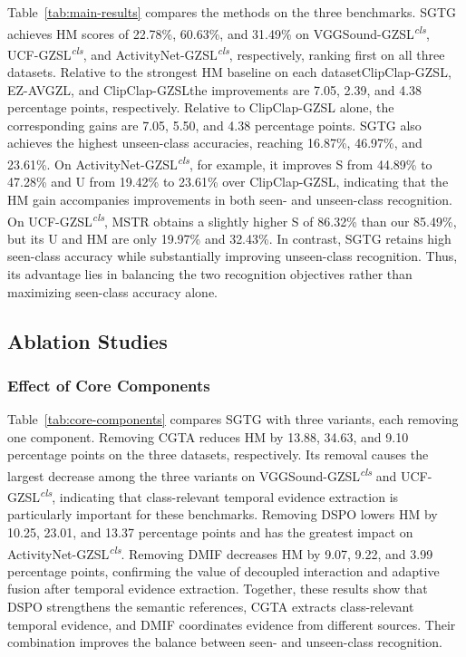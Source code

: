 Table~\ref{tab:main-results} compares the methods on the three benchmarks. SGTG achieves HM scores of 22.78\%, 60.63\%, and 31.49\% on VGGSound-GZSL\textsuperscript{\textit{cls}}, UCF-GZSL\textsuperscript{\textit{cls}}, and ActivityNet-GZSL\textsuperscript{\textit{cls}}, respectively, ranking first on all three datasets. Relative to the strongest HM baseline on each dataset\textemdash{}ClipClap-GZSL, EZ-AVGZL, and ClipClap-GZSL\textemdash{}the improvements are 7.05, 2.39, and 4.38 percentage points, respectively. Relative to ClipClap-GZSL alone, the corresponding gains are 7.05, 5.50, and 4.38 percentage points. SGTG also achieves the highest unseen-class accuracies, reaching 16.87\%, 46.97\%, and 23.61\%. On ActivityNet-GZSL\textsuperscript{\textit{cls}}, for example, it improves S from 44.89\% to 47.28\% and U from 19.42\% to 23.61\% over ClipClap-GZSL, indicating that the HM gain accompanies improvements in both seen- and unseen-class recognition. On UCF-GZSL\textsuperscript{\textit{cls}}, MSTR obtains a slightly higher S of 86.32\% than our 85.49\%, but its U and HM are only 19.97\% and 32.43\%. In contrast, SGTG retains high seen-class accuracy while substantially improving unseen-class recognition. Thus, its advantage lies in balancing the two recognition objectives rather than maximizing seen-class accuracy alone.

\subsection{Ablation Studies}\label{sec:ablation-studies}

\subsubsection{Effect of Core Components}\label{sec:effect-of-core-components}


Table~\ref{tab:core-components} compares SGTG with three variants, each removing one component. Removing CGTA reduces HM by 13.88, 34.63, and 9.10 percentage points on the three datasets, respectively. Its removal causes the largest decrease among the three variants on VGGSound-GZSL\textsuperscript{\textit{cls}} and UCF-GZSL\textsuperscript{\textit{cls}}, indicating that class-relevant temporal evidence extraction is particularly important for these benchmarks. Removing DSPO lowers HM by 10.25, 23.01, and 13.37 percentage points and has the greatest impact on ActivityNet-GZSL\textsuperscript{\textit{cls}}. Removing DMIF decreases HM by 9.07, 9.22, and 3.99 percentage points, confirming the value of decoupled interaction and adaptive fusion after temporal evidence extraction. Together, these results show that DSPO strengthens the semantic references, CGTA extracts class-relevant temporal evidence, and DMIF coordinates evidence from different sources. Their combination improves the balance between seen- and unseen-class recognition.

